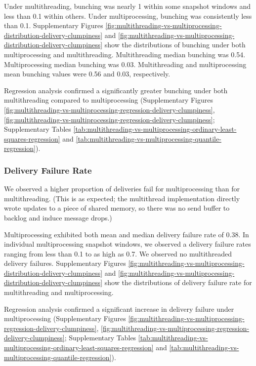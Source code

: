Under multithreading, bunching was nearly 1 within some snapshot windows and less than 0.1 within others.
Under multiprocessing, bunching was consistently less than 0.1.
Supplementary Figures \ref{fig:multithreading-vs-multiprocessing-distribution-delivery-clumpiness} and \ref{fig:multithreading-vs-multiprocessing-distribution-delivery-clumpiness} show the distributions of bunching under both multiprocessing and multithreading.
Multithreading median bunching was 0.54.
Multiprocessing median bunching was 0.03.
Multithreading and multiprocessing mean bunching values were 0.56 and 0.03, respectively.

Regression analysis confirmed a significantly greater bunching under both multithreading compared to multiprocessing (Supplementary Figures \ref{fig:multithreading-vs-multiprocessing-regression-delivery-clumpiness}, \ref{fig:multithreading-vs-multiprocessing-regression-delivery-clumpiness}; Supplementary Tables \ref{tab:multithreading-vs-multiprocessing-ordinary-least-squares-regression} and \ref{tab:multithreading-vs-multiprocessing-quantile-regression}).

\subsubsection{Delivery Failure Rate}

We observed a higher proportion of deliveries fail for multiprocessing than for multithreading.
(This is as expected; the multithread implementation directly wrote updates to a piece of shared memory, so there was no send buffer to backlog and induce message drops.)

Multiprocessing exhibited both mean and median delivery failure rate of 0.38.
In individual multiprocessing snapshot windows, we observed a delivery failure rates ranging from less than 0.1 to as high as 0.7.
We observed no multithreaded delivery failures.
Supplementary Figures \ref{fig:multithreading-vs-multiprocessing-distribution-delivery-clumpiness} and \ref{fig:multithreading-vs-multiprocessing-distribution-delivery-clumpiness} show the distributions of delivery failure rate for multithreading and multiprocessing.

Regression analysis confirmed a significant increase in delivery failure under multiprocessing (Supplementary Figures \ref{fig:multithreading-vs-multiprocessing-regression-delivery-clumpiness}, \ref{fig:multithreading-vs-multiprocessing-regression-delivery-clumpiness}; Supplementary Tables \ref{tab:multithreading-vs-multiprocessing-ordinary-least-squares-regression} and \ref{tab:multithreading-vs-multiprocessing-quantile-regression}).
